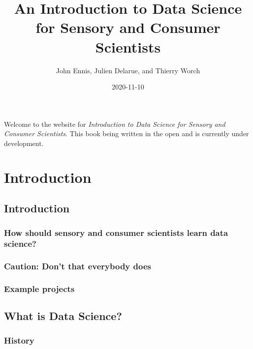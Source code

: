\documentclass[
]{book}
\title{An Introduction to Data Science for Sensory and Consumer Scientists}
\author{John Ennis, Julien Delarue, and Thierry Worch}
\date{2020-11-10}
\begin{document}
\maketitle

{
\setcounter{tocdepth}{1}
\tableofcontents
}
Welcome to the website for \emph{Introduction to Data Science for Sensory and Consumer Scientists}. This book being written in the open and is currently under development.

\hypertarget{part-introduction}{%
\part*{Introduction}\label{part-introduction}}

\hypertarget{intro}{%
\chapter{Introduction}\label{intro}}

\hypertarget{how-should-sensory-and-consumer-scientists-learn-data-science}{%
\section{How should sensory and consumer scientists learn data science?}\label{how-should-sensory-and-consumer-scientists-learn-data-science}}

\hypertarget{caution-dont-that-everybody-does}{%
\section{Caution: Don't that everybody does}\label{caution-dont-that-everybody-does}}

\hypertarget{example-projects}{%
\section{Example projects}\label{example-projects}}

\hypertarget{data_science}{%
\chapter{What is Data Science?}\label{data_science}}

\hypertarget{history}{%
\section{History}\label{history}}
\end{document}
